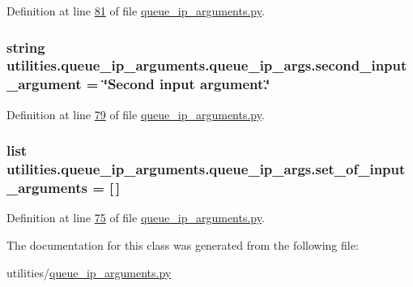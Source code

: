 Definition at line \hyperlink{queue__ip__arguments_8py_source_l00081}{81} of file \hyperlink{queue__ip__arguments_8py_source}{queue\+\_\+ip\+\_\+arguments.\+py}.

\hypertarget{classutilities_1_1queue__ip__arguments_1_1queue__ip__args_a0b179a70c0e57de2794d0d532e534c9c}{}
\subsubsection[{second\+\_\+input\+\_\+argument}]{\setlength{\rightskip}{0pt plus 5cm}string utilities.\+queue\+\_\+ip\+\_\+arguments.\+queue\+\_\+ip\+\_\+args.\+second\+\_\+input\+\_\+argument = \char`\"{}Second input argument.\char`\"{}\hspace{0.3cm}{\ttfamily [static]}}\label{classutilities_1_1queue__ip__arguments_1_1queue__ip__args_a0b179a70c0e57de2794d0d532e534c9c}


Definition at line \hyperlink{queue__ip__arguments_8py_source_l00079}{79} of file \hyperlink{queue__ip__arguments_8py_source}{queue\+\_\+ip\+\_\+arguments.\+py}.

\hypertarget{classutilities_1_1queue__ip__arguments_1_1queue__ip__args_acc8e7685be71a7f95ede7c980355c9f3}{}
\subsubsection[{set\+\_\+of\+\_\+input\+\_\+arguments}]{\setlength{\rightskip}{0pt plus 5cm}list utilities.\+queue\+\_\+ip\+\_\+arguments.\+queue\+\_\+ip\+\_\+args.\+set\+\_\+of\+\_\+input\+\_\+arguments = \mbox{[}$\,$\mbox{]}\hspace{0.3cm}{\ttfamily [static]}}\label{classutilities_1_1queue__ip__arguments_1_1queue__ip__args_acc8e7685be71a7f95ede7c980355c9f3}


Definition at line \hyperlink{queue__ip__arguments_8py_source_l00075}{75} of file \hyperlink{queue__ip__arguments_8py_source}{queue\+\_\+ip\+\_\+arguments.\+py}.



The documentation for this class was generated from the following file\+:\begin{DoxyCompactItemize}
\item 
utilities/\hyperlink{queue__ip__arguments_8py}{queue\+\_\+ip\+\_\+arguments.\+py}\end{DoxyCompactItemize}
